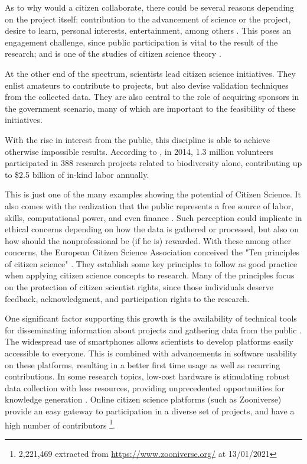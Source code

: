 As to why would a citizen collaborate, there could be several reasons depending on the project itself: contribution to the advancement of science or the project, desire to learn, personal interests, entertainment, among others \cite{tinati2016because}. This poses an engagement challenge, since public participation is vital to the result of the research; and is one of the studies of citizen science theory \cite{bowser2013using}.

At the other end of the spectrum, scientists lead citizen science initiatives. They enlist amateurs to contribute to projects, but also devise validation techniques from the collected data. They are also central to the role of acquiring sponsors in the government scenario, many of which are important to the feasibility of these initiatives.

With the rise in interest from the public, this discipline is able to achieve otherwise impossible results. According to \cite{theobald2015global}, in 2014, 1.3 million volunteers participated in 388 research projects related to biodiversity alone, contributing up to \$2.5 billion of in-kind labor annually.

This is just one of the many examples showing the potential of Citizen Science. It also comes with the realization that the public represents a free source of labor, skills, computational power, and even finance \cite{silvertown2009new}. Such perception could implicate in ethical concerns depending on how the data is gathered or processed, but also on how should the nonprofessional be (if he is) rewarded. With these among other concerns, the European Citizen Science Association conceived the "Ten principles of citizen science" \cite{robinson2018ten}. They establish some key principles to follow as good practice when applying citizen science concepts to research. Many of the principles focus on the protection of citizen scientist rights, since those individuals deserve feedback, acknowledgment, and participation rights to the research.

One significant factor supporting this growth is the availability of technical tools for disseminating information about projects and gathering data from the public \cite{silvertown2009new}. The widespread use of smartphones allows scientists to develop platforms easily accessible to everyone. This is combined with advancements in software usability on these platforms, resulting in a better first time usage as well as recurring contributions. In some research topics, low-cost hardware is stimulating robust data collection with less resources, providing unprecedented opportunities for knowledge generation \cite{buytaert2014citizen}. Online citizen science platforms (such as Zooniverse) provide an easy gateway to participation in a diverse set of projects, and have a high number of contributors \footnote{2,221,469 extracted from \url{https://www.zooniverse.org/} at 13/01/2021}.


